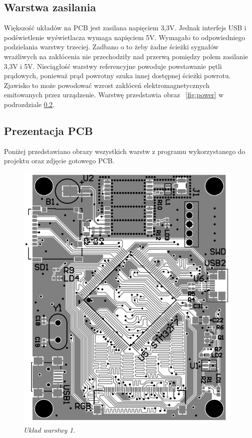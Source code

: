\documentclass[eng,printmode]{mgr}
\begin{document}
\subsection{Warstwa zasilania}
Większość układów na PCB jest zasilana napięciem 3,3V. Jednak interfejs USB i podświetlenie wyświetlacza wymaga napięciem 5V. Wymagało to odpowiedniego podzielania warstwy trzeciej. Zadbano o to żeby żadne ścieżki sygnałów wrażliwych na zakłócenia nie przechodziły nad przerwą pomiędzy polem zasilanie 3,3V i 5V. Nieciągłość warstwy referencyjne powoduje powstawanie pętli prądowych, ponieważ prąd powrotny szuka innej dostępnej ścieżki powrotu. Zjawisko to może powodować wzrost zakłóceń elektromagnetycznych emitowanych przez urządzenie. Warstwę przedstawia obraz ~\ref{fig:power} w podrozdziale \ref{pcbOverview}.
\subsection{Prezentacja PCB} \label{pcbOverview}
Poniżej przedstawiano obrazy wszystkich warstw z programu wykorzystanego do projektu oraz zdjęcie gotowego PCB.
\begin{center}\centering
\vspace*{\fill}
\begin{figure}[!h]
    \centering
    \includegraphics[width=\textwidth]{pcb/top.png}
    \caption{\textit{\scriptsize Układ warstwy 1.}}
\end{figure}
\vfill
\end{center}
\newpage
\end{document}
